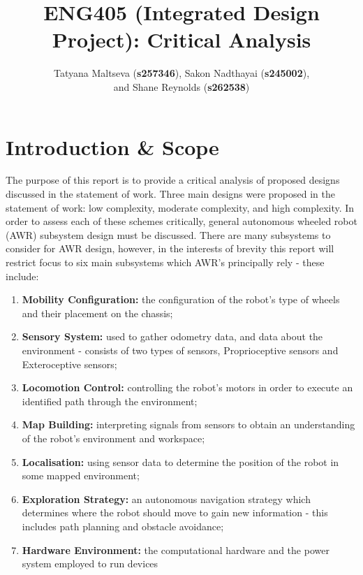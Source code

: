 \documentclass[a4paper]{article}
\begin{document}
\title{ENG405 (Integrated Design Project): Critical Analysis}
\author{Tatyana Maltseva (\textbf{s257346}), Sakon Nadthayai (\textbf{s245002}),\\ and Shane Reynolds (\textbf{s262538})}

\maketitle

\footnotesize\tableofcontents

\newpage
\normalsize
\section{Introduction \& Scope}
The purpose of this report is to provide a critical analysis of proposed designs discussed in the statement of work. Three main designs were proposed in the statement of work: low complexity, moderate complexity, and high complexity. In order to assess each of these schemes critically, general autonomous wheeled robot (AWR) subsystem design must be discussed. There are many subsystems to consider for AWR design, however, in the interests of brevity this report will restrict focus to six main subsystems which AWR's principally rely - these include:
\begin{enumerate}
\item \textbf{Mobility Configuration:} the configuration of the robot's type of wheels and their placement on the chassis;
\item \textbf{Sensory System:} used to gather odometry data, and data about the environment - consists of two types of sensors, Proprioceptive sensors and Exteroceptive sensors;
\item \textbf{Locomotion Control:} controlling the robot's motors in order to execute an identified path through the environment;
\item \textbf{Map Building:} interpreting signals from sensors to obtain an understanding of the robot's environment and workspace;
\item \textbf{Localisation:} using sensor data to determine the position of the robot in some mapped environment;
\item \textbf{Exploration Strategy:} an autonomous navigation strategy which determines where the robot should move to gain new information - this includes path planning and obstacle avoidance;
\item \textbf{Hardware Environment:} the computational hardware and the power system employed to run devices
\end{enumerate}
\end{document}
